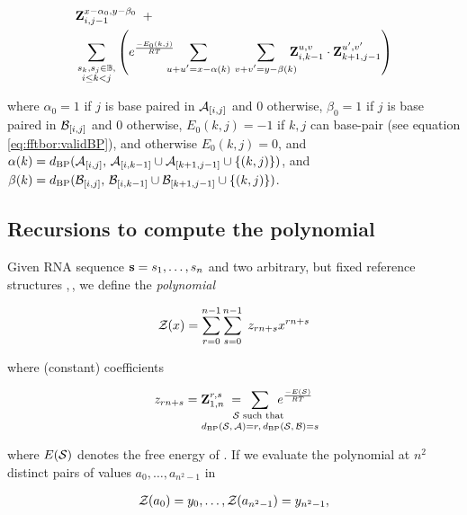 \begin{align}
\label{eq:ffttwo:bfZabij}
\begin{split}
& \bfZ{x-\alpha_0,y-\beta_0}{i,j-1}\enspace + \\
& \sum_{\substack{s_k,s_j \in \bpSet, \\ i \le k<j}}
\left(
\boltzNuss{k,j}\quad
\sum_{\mathclap{u+u'=x-\alpha(k)}}\hspace{3.75em}
\sum_{\mathclap{v+v'=y-\beta(k)}}\quad
\bfZ{u,v}{i,k-1} \cdot \bfZ{u',v'}{k+1,j-1}
\right)
\end{split}
\end{align}

where $\alpha_0 = 1$ if $j$ is base paired in $\mathcal A_{[i,j]}$ and $0$ otherwise,
$\beta_0 = 1$ if $j$ is base paired in $\mathcal B_{[i,j]}$ and $0$ otherwise,
$E_0(k,j)=-1$ if $k,j$ can base-pair
(see equation \ref{eq:fftbor:validBP}), and otherwise $E_0(k,j)=0$, and
$\alpha(k) =
d_{\text{BP}}(\mathcal A_{[i,j]},\,\mathcal A_{[i,k-1]} \cup \mathcal A_{[k+1,j-1]} \cup \{ (k,j) \})$,
and
$\beta(k) =
d_{\text{BP}}(\mathcal B_{[i,j]},\,\mathcal B_{[i,k-1]} \cup \mathcal B_{[k+1,j-1]} \cup \{ (k,j) \})$.

\subsection{Recursions to compute the polynomial
\texorpdfstring{}{}}
\label{subsec:ffttwo:polynomial}

Given RNA sequence ${\bf s} = s_1,\dots,s_n$
and two arbitrary, but fixed reference
structures \strA,\,\strB, we define the {\em polynomial}

\begin{align}
\label{eq:ffttwo:zOfX}
\emZ{} = \sum_{r=0}^{n-1} \sum_{s=0}^{n-1}\; z_{rn+s} x^{rn+s}
\end{align}

where (constant) coefficients

\begin{align}
z_{rn+s} = \bfZ{r,s}{1,n}\;=
\enspace\sum_{\mathclap{\substack{
\str \text{ such that } \rule[-.5ex]{0pt}{0pt} \\
\dBP{\str}{\strA} = r,\,\dBP{\str}{\strB} = s
}}}\enspace
\boltzF{\str}
\end{align}

where $E(\mathcal S)$ denotes the free energy of \str.
If we evaluate the polynomial \emZ{} at $n^2$ distinct pairs of values
$a_0,\dots,a_{n^2-1}$ in

\begin{align}
\label{eq:ffttwo:solutionsForAlpha}
\emZof{}{a_0} = y_{0}, \dots, \emZof{}{a_{n^2-1}} = y_{n^2-1},
\end{align}

